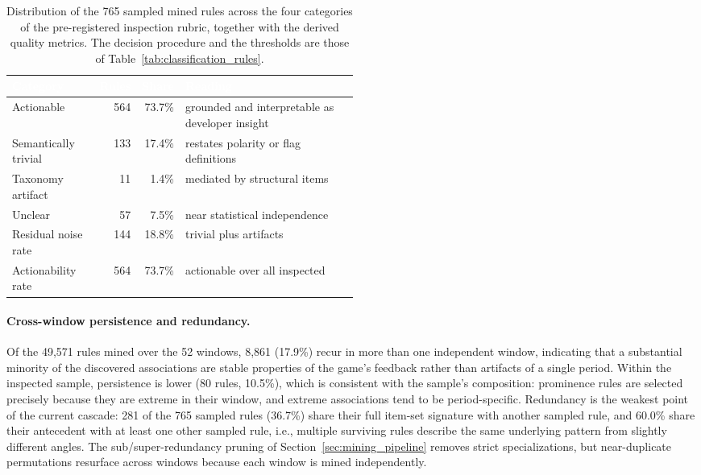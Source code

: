 \begin{table}[H]
    \centering
    \caption{Distribution of the 765 sampled mined rules across the four categories of the pre-registered inspection rubric, together with the derived quality metrics. The decision procedure and the thresholds are those of Table~\ref{tab:classification_rules}.}
    \label{tab:rq2_categories}
    \begin{tabular}{lrrp{0.5\linewidth}}
        \toprule
        \rowcolor{black}
        \textbf{\textcolor{white}{Category}} & \textbf{\textcolor{white}{Rules}} & \textbf{\textcolor{white}{Share}} & \textbf{\textcolor{white}{Reading}}\\
        \midrule
        Actionable & 564 & 73.7\% & grounded and interpretable as developer insight\\
        Semantically trivial & 133 & 17.4\% & restates polarity or flag definitions\\
        Taxonomy artifact & 11 & 1.4\% & mediated by structural items\\
        Unclear & 57 & 7.5\% & near statistical independence\\
        \midrule
        Residual noise rate & 144 & 18.8\% & trivial plus artifacts\\
        Actionability rate & 564 & 73.7\% & actionable over all inspected\\
        \bottomrule
    \end{tabular}
\end{table}

\paragraph{Cross-window persistence and redundancy.} Of the 49{,}571 rules mined over the 52 windows, 8{,}861 (17.9\%) recur in more than one independent window, indicating that a substantial minority of the discovered associations are stable properties of the game's feedback rather than artifacts of a single period. Within the inspected sample, persistence is lower (80 rules, 10.5\%), which is consistent with the sample's composition: prominence rules are selected precisely because they are extreme in their window, and extreme associations tend to be period-specific. Redundancy is the weakest point of the current cascade: 281 of the 765 sampled rules (36.7\%) share their full item-set signature with another sampled rule, and 60.0\% share their antecedent with at least one other sampled rule, i.e., multiple surviving rules describe the same underlying pattern from slightly different angles. The sub/super-redundancy pruning of Section~\ref{sec:mining_pipeline} removes strict specializations, but near-duplicate permutations resurface across windows because each window is mined independently.

